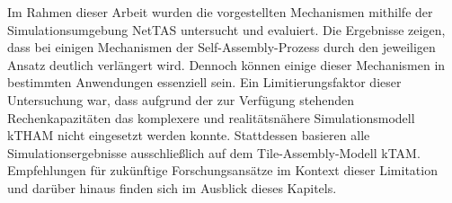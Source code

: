 Im Rahmen dieser Arbeit wurden die vorgestellten Mechanismen mithilfe der Simulationsumgebung NetTAS untersucht und evaluiert. Die Ergebnisse zeigen, dass bei einigen Mechanismen der Self-Assembly-Prozess durch den jeweiligen Ansatz deutlich verlängert wird. Dennoch können einige dieser Mechanismen in bestimmten Anwendungen essenziell sein. Ein Limitierungsfaktor dieser Untersuchung war, dass aufgrund der zur Verfügung stehenden Rechenkapazitäten das komplexere und realitätsnähere Simulationsmodell kTHAM nicht eingesetzt werden konnte. Stattdessen basieren alle Simulationsergebnisse ausschließlich auf dem Tile-Assembly-Modell kTAM. Empfehlungen für zukünftige Forschungsansätze im Kontext dieser Limitation und darüber hinaus finden sich im Ausblick dieses Kapitels.






